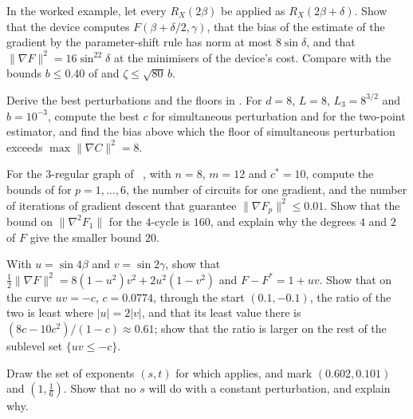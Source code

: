 \documentclass[handoutsbeamer.tex]{subfiles}
\begin{document}
\begin{frame}
\onp{\footnotesize}
\begin{exe}\label{exe:ch08:mixer}
In the worked example, let every $R_X(2\beta)$ be applied as $R_X(2\beta+\delta)$. Show that the device computes $F(\beta+\delta/2,\gamma)$, that the bias of the estimate of the gradient by the parameter-shift rule has norm at most $8\sin\delta$, and that $\|\nabla F\|^2 = 16\sin^22\delta$ at the minimisers of the device's cost. Compare with the bounds $b\le0.40$ of  and $\zeta\le\sqrt{80}\,b$.
\end{exe}
\begin{exe}\label{exe:ch08:floors}
Derive the best perturbations and the floors in . For $d = 8$, $L = 8$, $L_3 = 8^{3/2}$ and $b = 10^{-3}$, compute the best $c$ for simultaneous perturbation and for the two-point estimator, and find the bias above which the floor of simultaneous perturbation exceeds $\max\|\nabla C\|^2 = 8$.
\end{exe}
\end{frame}

\begin{frame}
\onp{\footnotesize}
\begin{exe}\label{exe:ch08:qaoa}
For the $3$-regular graph of \Chap~, with $n = 8$, $m = 12$ and $c^* = 10$, compute the bounds of  for $p = 1,\dots,6$, the number of circuits for one gradient, and the number of iterations of gradient descent that guarantee $\|\nabla F_p\|^2\le0.01$. Show that the bound on $\|\nabla^2F_1\|$ for the $4$-cycle is $160$, and explain why the degrees $4$ and $2$ of $F$ give the smaller bound $20$.
\end{exe}
\end{frame}

\begin{frame}
\onp{\footnotesize}
\begin{exe}\label{exe:ch08:plw}
With $u = \sin4\beta$ and $v = \sin2\gamma$, show that $\frac12\|\nabla F\|^2 = 8(1-u^2)v^2+2u^2(1-v^2)$ and $F-F^* = 1+uv$. Show that on the curve $uv = -c$, $c = 0.0774$, through the start $(0.1,-0.1)$, the ratio of the two is least where $|u| = 2|v|$, and that its least value there is $(8c-10c^2)/(1-c)\approx0.61$; show that the ratio is larger on the rest of the sublevel set $\{uv\le-c\}$.
\end{exe}
\begin{exe}\label{exe:ch08:gains}
Draw the set of exponents $(s,t)$ for which  applies, and mark $(0.602,0.101)$ and $(1,\frac16)$. Show that no $s$ will do with a constant perturbation, and explain why.
\end{exe}
\end{frame}

\begin{frame}[allowframebreaks]
\biblio
\end{frame}
\end{document}
